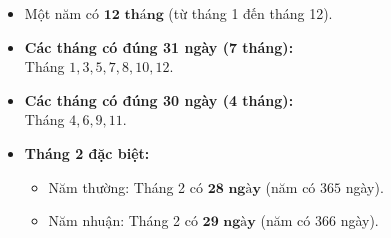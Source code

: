 \documentclass[11pt,a4paper]{article}
\begin{document}
\begin{minipage}[t]{0.49\textwidth}\vspace{0pt}
\begin{tcolorbox}[
  enhanced,
  colback=teal!4!white,
  colframe=teal!75!black,
  arc=2mm, boxrule=0.8pt,
  left=2mm, right=2mm, top=1.8mm, bottom=1.8mm,
  title={\footnotesize\bfseries\color{white}\faCheckSquare\ 2. Số ngày các tháng trong năm}
]
{\footnotesize
\begin{itemize}\setlength{\itemsep}{1.5pt}\setlength{\leftskip}{-2.5mm}
  \item Một năm có $\mathbf{12\text{ tháng}}$ (từ tháng 1 đến tháng 12).
  \item \textbf{Các tháng có đúng 31 ngày (7 tháng):}\\
  Tháng $1, 3, 5, 7, 8, 10, 12$.
  \item \textbf{Các tháng có đúng 30 ngày (4 tháng):}\\
  Tháng $4, 6, 9, 11$.
  \item \textbf{Tháng 2 đặc biệt:}
  \begin{itemize}\setlength{\itemsep}{0.5pt}\setlength{\leftskip}{-2.5mm}
    \item Năm thường: Tháng 2 có $\mathbf{28\text{ ngày}}$ (năm có $365$ ngày).
    \item Năm nhuận: Tháng 2 có $\mathbf{29\text{ ngày}}$ (năm có $366$ ngày).
  \end{itemize}
\end{itemize}
}
\end{tcolorbox}
\end{minipage}
\end{document}
